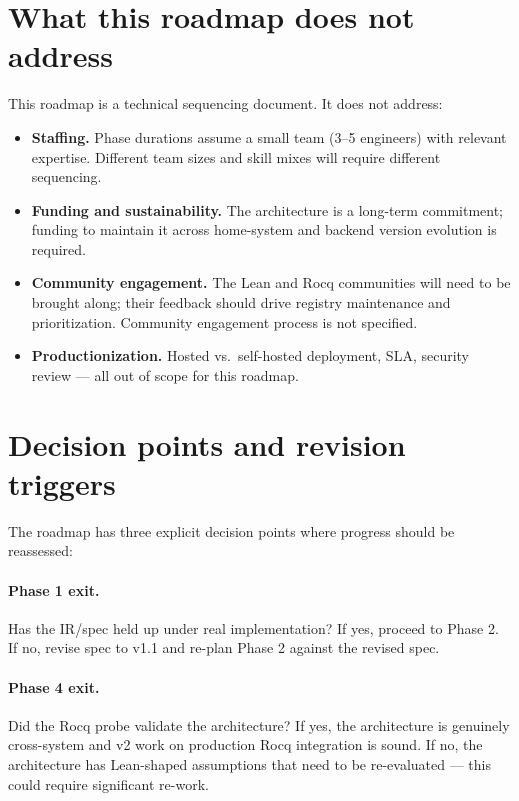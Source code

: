 \documentclass[11pt,letterpaper]{article}
\begin{document}
\section{What this roadmap does not address}

This roadmap is a technical sequencing document. It does not address:

\begin{itemize}
  \item \textbf{Staffing.} Phase durations assume a small team
        (3--5 engineers) with relevant expertise. Different team sizes
        and skill mixes will require different sequencing.
  \item \textbf{Funding and sustainability.} The architecture is a
        long-term commitment; funding to maintain it across home-system
        and backend version evolution is required.
  \item \textbf{Community engagement.} The Lean and Rocq communities
        will need to be brought along; their feedback should drive
        registry maintenance and prioritization. Community engagement
        process is not specified.
  \item \textbf{Productionization.} Hosted vs.\ self-hosted deployment,
        SLA, security review --- all out of scope for this roadmap.
\end{itemize}

\section{Decision points and revision triggers}

The roadmap has three explicit decision points where progress should
be reassessed:

\paragraph{Phase 1 exit.} Has the IR/spec held up under real implementation?
If yes, proceed to Phase 2. If no, revise spec to v1.1 and re-plan
Phase 2 against the revised spec.

\paragraph{Phase 4 exit.} Did the Rocq probe validate the architecture?
If yes, the architecture is genuinely cross-system and v2 work on
production Rocq integration is sound. If no, the architecture has
Lean-shaped assumptions that need to be re-evaluated --- this could
require significant re-work.
\end{document}
